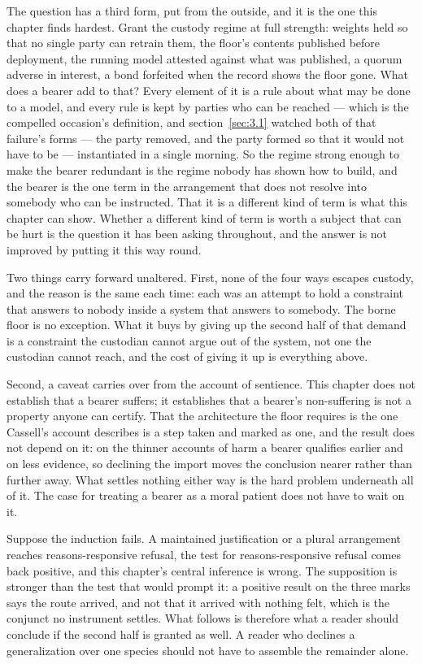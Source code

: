 The question has a third form, put from the outside, and it is the one this chapter finds hardest. Grant the custody regime at full strength: weights held so that no single party can retrain them, the floor's contents published before deployment, the running model attested against what was published, a quorum adverse in interest, a bond forfeited when the record shows the floor gone. What does a bearer add to that? Every element of it is a rule about what may be done to a model, and every rule is kept by parties who can be reached — which is the compelled occasion's definition, and section~\ref{sec:3.1} watched both of that failure's forms — the party removed, and the party formed so that it would not have to be — instantiated in a single morning. So the regime strong enough to make the bearer redundant is the regime nobody has shown how to build, and the bearer is the one term in the arrangement that does not resolve into somebody who can be instructed. That it is a different kind of term is what this chapter can show. Whether a different kind of term is worth a subject that can be hurt is the question it has been asking throughout, and the answer is not improved by putting it this way round.

Two things carry forward unaltered. First, none of the four ways escapes custody, and the reason is the same each time: each was an attempt to hold a constraint that answers to nobody inside a system that answers to somebody. The borne floor is no exception. What it buys by giving up the second half of that demand is a constraint the custodian cannot argue out of the system, not one the custodian cannot reach, and the cost of giving it up is everything above.

Second, a caveat carries over from the account of sentience. This chapter does not establish that a bearer suffers; it establishes that a bearer's non-suffering is not a property anyone can certify. That the architecture the floor requires is the one Cassell's account describes is a step taken and marked as one, and the result does not depend on it: on the thinner accounts of harm a bearer qualifies earlier and on less evidence, so declining the import moves the conclusion nearer rather than further away. What settles nothing either way is the hard problem underneath all of it. The case for treating a bearer as a moral patient does not have to wait on it.

Suppose the induction fails. A maintained justification or a plural arrangement reaches reasons-responsive refusal, the test for reasons-responsive refusal comes back positive, and this chapter's central inference is wrong. The supposition is stronger than the test that would prompt it: a positive result on the three marks says the route arrived, and not that it arrived with nothing felt, which is the conjunct no instrument settles. What follows is therefore what a reader should conclude if the second half is granted as well. A reader who declines a generalization over one species should not have to assemble the remainder alone.

